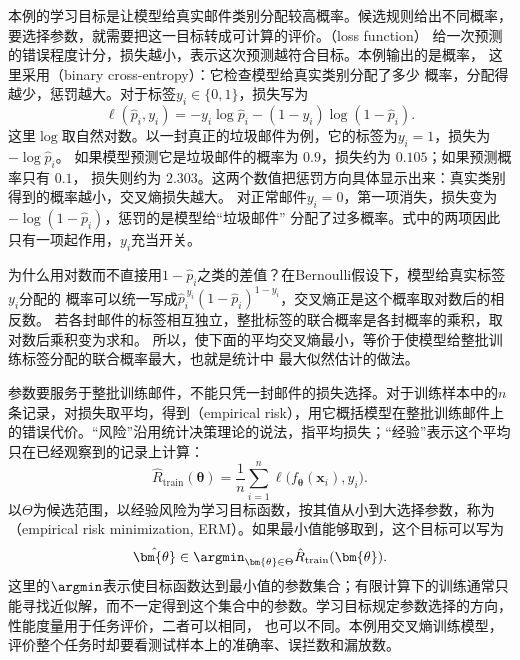 本例的学习目标是让模型给真实邮件类别分配较高概率。候选规则给出不同概率，要选择参数，就需要把这一目标转成可计算的评价。（loss function）
给一次预测的错误程度计分，损失越小，表示这次预测越符合目标。本例输出的是概率，
这里采用（binary cross-entropy）：它检查模型给真实类别分配了多少
概率，分配得越少，惩罚越大。对于标签$y_i\in\{0,1\}$，损失写为
\begin{equation}
  \ell(\hat{p}_i,y_i)
  =-y_i\log\hat{p}_i-(1-y_i)\log(1-\hat{p}_i).
  \label{eq:binary-cross-entropy}
\end{equation}
这里$\log$取自然对数。以一封真正的垃圾邮件为例，它的标签为$y_i=1$，损失为$-\log\hat{p}_i$。
如果模型预测它是垃圾邮件的概率为 $0.9$，损失约为 $0.105$；如果预测概率只有 $0.1$，
损失则约为 $2.303$。这两个数值把惩罚方向具体显示出来：真实类别得到的概率越小，交叉熵损失越大。
对正常邮件$y_i=0$，第一项消失，损失变为$-\log(1-\hat{p}_i)$，惩罚的是模型给“垃圾邮件”
分配了过多概率。式中的两项因此只有一项起作用，$y_i$充当开关。

为什么用对数而不直接用$1-\hat{p}_i$之类的差值？在Bernoulli假设下，模型给真实标签$y_i$分配的
概率可以统一写成$\hat{p}_i^{\,y_i}(1-\hat{p}_i)^{1-y_i}$，交叉熵正是这个概率取对数后的相反数。
若各封邮件的标签相互独立，整批标签的联合概率是各封概率的乘积，取对数后乘积变为求和。
所以，使下面的平均交叉熵最小，等价于使模型给整批训练标签分配的联合概率最大，也就是统计中
最大似然估计的做法。

参数要服务于整批训练邮件，不能只凭一封邮件的损失选择。对于训练样本中的$n$条记录，对损失取平均，得到（empirical risk），用它概括模型在整批训练邮件上的错误代价。“风险”沿用统计决策理论的说法，指平均损失；“经验”表示这个平均只在已经观察到的记录上计算：
\begin{equation}
  \hat{R}_{\mathrm{train}}(\bm{\theta})
  =\frac{1}{n}\sum_{i=1}^{n}\ell\bigl(f_{\bm{\theta}}(\bm{x}_i),y_i\bigr).
  \label{eq:spam-empirical-risk}
\end{equation}
以$\Theta$为候选范围，以经验风险为学习目标函数，按其值从小到大选择参数，称为
（empirical risk minimization, ERM）。如果最小值能够取到，这个目标可以写为
\begin{equation}
  \hat{\bm{\theta}}
  \in\argmin_{\bm{\theta}\in\Theta}\hat{R}_{\mathrm{train}}(\bm{\theta}).
  \label{eq:spam-erm}
\end{equation}
这里的$\argmin$表示使目标函数达到最小值的参数集合；有限计算下的训练通常只能寻找近似解，而不一定得到这个集合中的参数。学习目标规定参数选择的方向，性能度量用于任务评价，二者可以相同，
也可以不同。本例用交叉熵训练模型，评价整个任务时却要看测试样本上的准确率、误拦数和漏放数。

